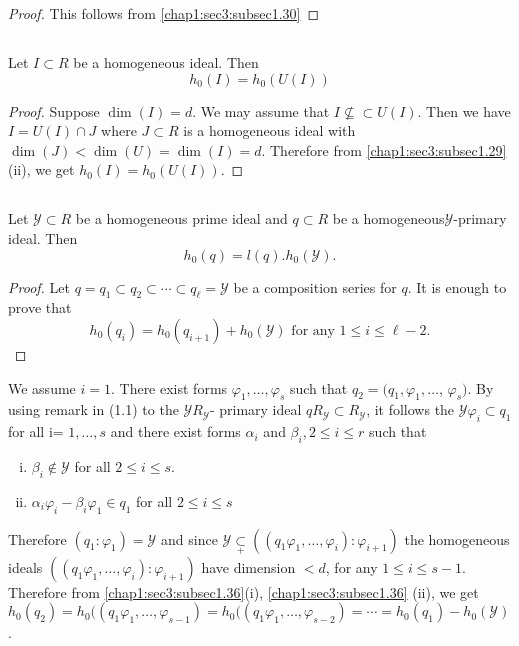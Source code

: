 \begin{proof}
This follows from \ref{chap1:sec3:subsec1.30}
\end{proof}

\subsection{}\label{chap1:sec3:subsec1.37}

Let $I \subset R$ be a homogeneous ideal. Then 
$$
h_0(I) = h_0(U(I))
$$
\begin{proof}
  Suppose $\dim (I) = d$. We may assume that $I\not\subseteq \subset U
  (I)$. Then we have $I = U(I) \cap J$ where $J \subset R$ is a
  homogeneous ideal with $\dim (J) < \dim (U)= \dim (I) = d$. Therefore from
  \ref{chap1:sec3:subsec1.29} (ii), we get $h_0(I) = h_0(U(I))$.  
\end{proof}

\subsection{}\label{chap1:sec3:subsec1.38} 
Let $\mathscr{Y} \subset R$ be a homogeneous prime ideal
  and $q \subset R$ be a homo\-geneous\pageoriginale $\mathscr{Y}$-primary ideal.  Then  
$$
h_0(q) = l (q). h_0(\mathscr{Y}).
$$
\begin{proof}
  Let $q= q_1 \subset q_2 \subset \cdots \subset q_\ell	 = \mathscr{Y}
  $ be a composition series for $q$. It is enough to prove that  
$$
h_0(q_i) = h_0(q_{i+1})+ h_0(\mathscr{Y}) \text{ for any } 1 \leq i \leq \ell-2.
$$ 
\end{proof}

We assume $i = 1$. There exist forms $\varphi_1,  \ldots, \varphi_s$
such that $q_2 = (q_1, \varphi_1,  \ldots$, $\varphi_s)$.  By using
remark in (1.1) to the $\mathscr{Y} R_{\mathscr{Y}}$- primary ideal $q
R_{\mathscr{Y}} \subset R_{\mathscr{Y}}$, it follows the $\mathscr{Y}
\varphi_i \subset q_1$ for all i= $1,  \ldots, s$ and there exist
forms $\alpha_i$ and $\beta_i, 2 \leq i \leq r$ such that  
\begin{enumerate}[(i)]
\item $\beta_i \notin \mathscr{Y}$ for all $2 \leq i \leq s$.
\item $\alpha_i \varphi_i - \beta_i \varphi_1 \in q_1 $ for all $2
  \leq i \leq s$ 
\end{enumerate} 

Therefore $(q_1:  \varphi_1) = \mathscr{Y}$ and since $\mathscr{Y}
 \underset{+}{\subset} (( q_1 \varphi_1,  \ldots, \varphi_i):
 \varphi_{i+1})$ the homogeneous ideals $(( q_1 \varphi_1,  \ldots,
 \varphi_i):  \varphi_{i+1})$ have dimension $< d$, for any $1 \leq i
 \leq s-1$. Therefore from
 \ref{chap1:sec3:subsec1.36}(i), \ref{chap1:sec3:subsec1.36} (ii), we
 get $h_0(q_2) = h_0 
 (( q_1 \varphi_1,  \ldots, \varphi_{s-1})= h_0 (( q_1 \varphi_1,
 \ldots, \varphi_{s-2})= \cdots = h_0 (q_1) - h_0(\mathscr{Y})$. 

